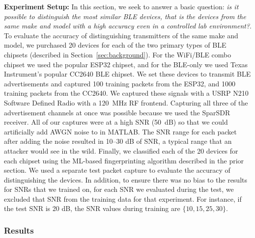\noindent\textbf{Experiment Setup:} In this section, we seek to answer a basic question: \textit{is it possible to distinguish the most similar BLE devices, that is the devices from the same make and model with a high accuracy even in a controlled lab environment?}. To evaluate the accuracy of distinguishing
transmitters of the same make and model, we purchased 20 devices for each of the two
primary types of BLE chipsets (described in Section~\ref{sec:background}). For
the WiFi/BLE combo chipset we used the popular ESP32 chipset, and for the
BLE-only we used Texas Instrument's popular CC2640 BLE chipset. We set these
devices to transmit BLE advertisements and captured 100 training packets from
the ESP32, and 1000 training packets from the CC2640. We captured these signals
with a USRP N210 Software Defined Radio with a 120~MHz RF frontend. Capturing all 
three of the advertisement channels at once was possible because we used the SparSDR~\cite{sparsdr}
receiver.
All of our captures were at a high SNR (50~dB) so that we could artificially add AWGN noise to in
MATLAB. The SNR range for each packet after adding the noise resulted in 10--30
dB of SNR, a typical range that an attacker would see in the wild.  Finally, we
classified each of the 20 devices for each chipset using the ML-based
fingerprinting algorithm described in the prior section. We used a separate test packet capture to evaluate the accuracy of
distinguishing the devices. In addition, to ensure there was no bias to the
results for SNRs that we trained on, for each SNR we evaluated during the test, we excluded that
SNR from the training data for that experiment. For instance, if the test SNR is 20 dB, the SNR values during training are $\{10,15,25,30\}$.






\subsubsection*{Results}

